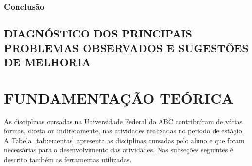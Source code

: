 \documentclass[
  12pt,				%
  openany,
  oneside,
  a4paper,			%
  english,			%
  brazil
]{article}
\numberwithin{figure}{section}
\numberwithin{table}{section}
\begin{document}
\subsubsection{Conclusão}

\subsection{DIAGNÓSTICO DOS PRINCIPAIS PROBLEMAS OBSERVADOS E SUGESTÕES DE MELHORIA}



\clearpage
\section{FUNDAMENTAÇÃO TEÓRICA}



As disciplinas cursadas na Universidade Federal do ABC contribuíram de várias formas, direta ou indiretamente, nas atividades realizadas no período de estágio. A Tabela~\ref{tab:ementas} apresenta as disciplinas cursadas pelo aluno e que foram necessárias para o desenvolvimento das atividades. Nas subseções seguintes é descrito também as ferramentas utilizadas.

%  
%  
%  
%  
%  
%  
%  
%  
%  
%  
%  
%  
\end{document}
